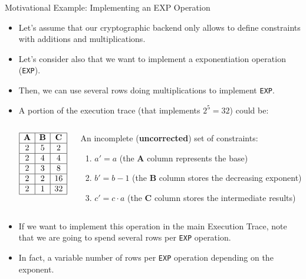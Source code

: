 \begin{frame}{Motivational Example: Implementing an EXP Operation}
\begin{itemize}
\small
\item Let's assume that our cryptographic backend only allows to define constraints with additions and multiplications.
\item Let's consider also that we want to implement a exponentiation operation (\texttt{EXP}).
\item Then, we can use several rows doing multiplications to implement \texttt{EXP}.
\item A portion of the execution trace (that implements $2^5 = 32$) could be:
\begin{columns}
\begin{column}{0.2\textwidth}
$$
\begin{array}{|c|c|c|}
\hline
\textbf{A} & \textbf{B} & \textbf{C} \\ \hline
2 & 5 & 2  \\ \hline
2 & 4 & 4  \\ \hline
2 & 3 & 8  \\ \hline
2 & 2 & 16 \\ \hline
2 & 1 & 32 \\ \hline
\end{array}$$
\end{column}

\begin{column}{0.7\textwidth}
\small
An incomplete (\textbf{uncorrected}) set of constraints:

\vspace{0.1cm}
\begin{enumerate}
\small
\item $a'=a$ \quad 
(the \textbf{A} column represents the base)
\item $b'=b-1$ \quad 
(the \textbf{B} column stores the decreasing exponent)
\item $c'=c\cdot a$ \quad 
(the \textbf{C} column stores the intermediate results)
\end{enumerate}
\end{column}
\end{columns}

\vspace{0.2cm}
\item If we want to implement this operation in the main Execution Trace, note that
we are going to spend several rows per \texttt{EXP} operation.
\item In fact, a variable number of rows per \texttt{EXP} operation depending on the exponent.
\end{itemize}
\end{frame}










